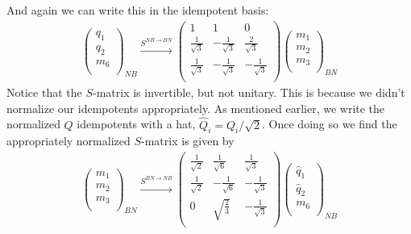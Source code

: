 And again we can write this in the idempotent basis:
\begin{align}
\left( \begin{matrix}
{q}_1\\
{q}_2\\
{m}_6\\
\end{matrix} \right)_{NB}
\xrightarrow{S^{NB \rightarrow BN}}
\left( \begin{matrix}
1& 1& 0 \\
\frac{1}{\sqrt{3}} & - \frac{1}{\sqrt{3}} & \frac{2}{\sqrt{3}} \\
\frac{1}{\sqrt{3}} & - \frac{1}{\sqrt{3}} & - \frac{1}{\sqrt{3}} \\
\end{matrix} \right)
\left( \begin{matrix}
{m}_1\\
{m}_2\\
{m}_3\\
\end{matrix} \right)_{BN}
\end{align}
Notice that the $S$-matrix is invertible, but not unitary. 
This is because we didn't normalize our idempotents appropriately. 
As mentioned earlier, we write the normalized $Q$ idempotents with a hat, $\widehat{Q}_i = Q_i /\sqrt{2}$.
Once doing so we find the appropriately normalized $S$-matrix is given by
\begin{align}\left( \begin{matrix}
{m}_1\\
{m}_2\\
{m}_3\\
\end{matrix} \right)_{BN}
\xrightarrow{S^{BN \rightarrow NB}}
\left( \begin{matrix}
\frac{1}{\sqrt{2}} & \frac{1}{\sqrt{6}} &  \frac{1}{\sqrt{3}} \\
\frac{1}{\sqrt{2}} & - \frac{1}{\sqrt{6}} & -\frac{1}{\sqrt{3}} \\
0& \sqrt{\frac{2}{3}} & -\frac{1}{\sqrt{3}} \\
\end{matrix} \right)
\left( \begin{matrix}
\widehat{{q}}_1\\
\widehat{{q}}_2\\
{m}_6\\
\end{matrix} \right)_{NB}
\end{align}
